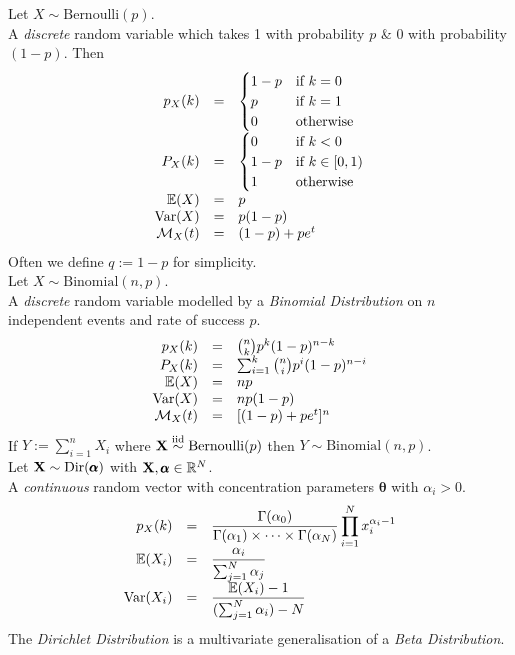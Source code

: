 \documentclass[11pt,a4paper]{article}
\begin{document}
Let $X\sim\text{Bernoulli}(p)$.\\
A \textit{discrete} random variable which takes 1 with probability $p$ \& 0 with probability $(1-p)$. Then
\[\begin{array}{rcl}
p_X(k)&=&\begin{cases}1-p&\text{if }k=0\\p&\text{if }k=1\\0&\text{otherwise}\end{cases}\\
P_X(k)&=&\begin{cases}0&\text{if }k<0\\1-p&\text{if }k\in[0,1)\\1&\text{otherwise}\end{cases}\\
\mathbb{E}(X)&=&p\\
\mathrm{Var}(X)&=&p(1-p)\\
\mathcal{M}_X(t)&=&(1-p)+pe^t
\end{array}\]
\nb Often we define $q:=1-p$ for simplicity.\\

Let $X\sim\text{Binomial}(n,p)$.\\
A \textit{discrete} random variable modelled by a \textit{Binomial Distribution} on $n$ independent events and rate of success $p$.
\[\begin{array}{rcl}
p_X(k)&=&{n\choose k}p^k(1-p)^{n-k}\\
P_X(k)&=&\sum_{i=1}^k{n\choose i}p^i(1-p)^{n-i}\\
\mathbb{E}(X)&=&np\\
\mathrm{Var}(X)&=&np(1-p)\\
\mathcal{M}_X(t)&=&[(1-p)+pe^t]^n
\end{array}\]
\nb If $Y:=\sum_{i=1}^nX_i$ where $\textbf{X}\overset{\text{iid}}{\sim}\text{Bernoulli}(p)$ then $Y\sim\text{Binomial}(n,p)$.\\

Let $\textbf{X}\sim\text{Dir}(\pmb\alpha)$ with $\textbf{X},\pmb\alpha\in\mathbb{R}^N$.\\
A \textit{continuous} random vector with concentration parameters $\pmb\theta$ with $\alpha_i>0$.
\[\begin{array}{rcl}
p_X(k)&=&{\displaystyle\dfrac{\Gamma(\alpha_0)}{\Gamma(\alpha_1)\times\dots\times\Gamma(\alpha_N)}\prod_{i=1}^Nx_i^{\alpha_i-1}}\\
\mathbb{E}(X_i)&=&\dfrac{\alpha_i}{\sum_{j=1}^N\alpha_j}\\
\mathrm{Var}(X_i)&=&\dfrac{\mathbb{E}(X_i)-1}{(\sum_{j=1}^N\alpha_i)-N}\\
\end{array}\]
\nb The \textit{Dirichlet Distribution} is a multivariate generalisation of a \textit{Beta Distribution}.\\
\end{document}
